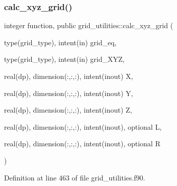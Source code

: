 \subsubsection{\texorpdfstring{calc\+\_\+xyz\+\_\+grid()}{calc\_xyz\_grid()}}
{\footnotesize\ttfamily integer function, public grid\+\_\+utilities\+::calc\+\_\+xyz\+\_\+grid (\begin{DoxyParamCaption}\item[{type(grid\+\_\+type), intent(in)}]{grid\+\_\+eq,  }\item[{type(grid\+\_\+type), intent(in)}]{grid\+\_\+\+X\+YZ,  }\item[{real(dp), dimension(\+:,\+:,\+:), intent(inout)}]{X,  }\item[{real(dp), dimension(\+:,\+:,\+:), intent(inout)}]{Y,  }\item[{real(dp), dimension(\+:,\+:,\+:), intent(inout)}]{Z,  }\item[{real(dp), dimension(\+:,\+:,\+:), intent(inout), optional}]{L,  }\item[{real(dp), dimension(\+:,\+:,\+:), intent(inout), optional}]{R }\end{DoxyParamCaption})}



Definition at line 463 of file grid\+\_\+utilities.\+f90.

